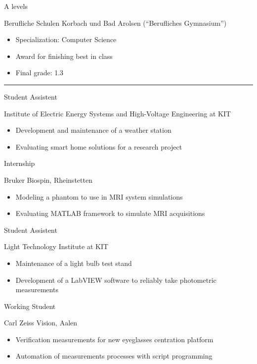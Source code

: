\documentclass[a4paper,10pt]{article}
\newlength{\cvcolumngapwidth}
\newlength{\cvleftcolumnwidth}
\newlength{\cvrightcolumnwidth}
\newcommand{\cvsectionstyle}[1]{{\normalsize\textcolor{cvsectioncolor}{#1}}}
\newcommand{\cvtitlestyle}[1]{{\large\textcolor{cvtitlecolor}{#1}}}
\newcommand{\cvdurationstyle}[1]{{\small\textcolor{cvdurationcolor}{#1}}}
\newlength{\cvafteritemskipamount}
\newlength{\cvaftersectionskipamount}
\newlength{\cvaftertitleskipamount}
\newlength{\cvparskip}
\newcommand{\cvsection}[1]{
    \begin{minipage}[t][][b]{\cvleftcolumnwidth}
        \raggedleft\cvsectionstyle{#1}
    \end{minipage}%
    \hspace{\cvcolumngapwidth}%
    \begin{minipage}[t]{\cvrightcolumnwidth}
        \textcolor{cvrulecolor}{\rule{\cvrightcolumnwidth}{0.3mm}}
    \end{minipage}

    \vspace{\cvaftersectionskipamount}
}
\newcommand{\cvitem}[2]{
    \begin{minipage}[t]{\cvleftcolumnwidth}
    \strut\vspace*{-\baselineskip}\newline %
    \raggedleft #1
    \end{minipage}%
    \hspace{\cvcolumngapwidth}%
    \begin{minipage}[t]{\cvrightcolumnwidth}
        \setlength{\parskip}{\cvparskip}
        \strut\vspace*{-\baselineskip}\newline #2 %
    \end{minipage}

    \vspace{\cvafteritemskipamount}
}
\newcommand{\cvtitle}[1]{
    \cvtitlestyle{#1}

    \vspace{\cvaftertitleskipamount}
    \vspace{-\cvparskip}
}
\begin{document}
\cvitem{\cvdurationstyle{2009 -- 2012}}{\cvtitle{A levels}
    Berufliche Schulen Korbach und Bad Arolsen (``Berufliches Gymnasium'')
    \begin{itemize}[leftmargin=*]
    	\item Specialization: Computer Science
    	\item Award for finishing best in class
        \item Final grade: 1.3
    \end{itemize}
}

\cvsection{WORK EXPERIENCE}

\cvitem{\cvdurationstyle{May 2017 -- now}}{\cvtitle{Student Assistent}
    Institute of Electric Energy Systems and High-Voltage Engineering at KIT
    \begin{itemize}[leftmargin=*]
        \item Development and maintenance of a weather station
        \item Evaluating smart home solutions for a research project
    \end{itemize}
}

\cvitem{\cvdurationstyle{May 2018 -- July 2018}}{\cvtitle{Internship}
    Bruker Biospin, Rheinstetten
    \begin{itemize}[leftmargin=*]
        \item Modeling a phantom to use in MRI system simulations
        \item Evaluating MATLAB framework to simulate MRI acquisitions 
    \end{itemize}
}

\cvitem{\cvdurationstyle{May 2017 -- March 2018}}{\cvtitle{Student Assistent}
    Light Technology Institute at KIT
    \begin{itemize}[leftmargin=*]
        \item Maintenance of a light bulb test stand
        \item Development of a LabVIEW software to reliably take photometric measurements
    \end{itemize}
}

\cvitem{\cvdurationstyle{August 2015}}{\cvtitle{Working Student}
    Carl Zeiss Vision, Aalen
    \begin{itemize}[leftmargin=*]
        \item Verification measurements for new eyeglasses centration platform
        \item Automation of measurements processes with script programming
    \end{itemize}
}
\end{document}
